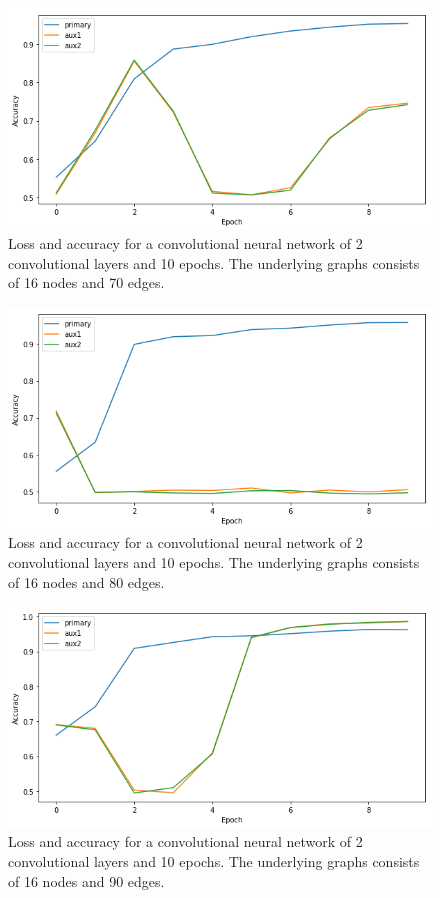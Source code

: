 \documentclass[letterpaper,UKenglish]{lipics-v2018}
\begin{document}
\begin{figure}
\centering
  \includegraphics[scale = .5]{pic/70-edges-conv.png}
\caption{Loss and accuracy for a convolutional neural network of 2 convolutional layers and 10 epochs. The underlying graphs consists of 16 nodes and 70 edges.}
\end{figure}

\begin{figure}
\centering
  \includegraphics[scale = .5]{pic/80-edges-conv.png}
\caption{Loss and accuracy for a convolutional neural network of 2 convolutional layers and 10 epochs. The underlying graphs consists of 16 nodes and 80 edges.}
\end{figure}

\begin{figure}
\centering
  \includegraphics[scale = .5]{pic/90-edges-conv.png}
\caption{Loss and accuracy for a convolutional neural network of 2 convolutional layers and 10 epochs. The underlying graphs consists of 16 nodes and 90 edges.}
\end{figure}
\end{document}
